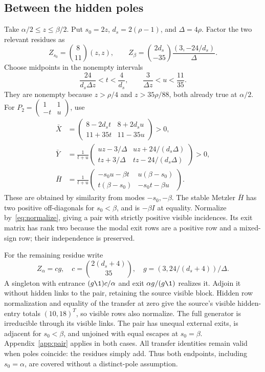 \subsection{Between the hidden poles}
Take $\alpha/2\le z\le\beta/2$. Put $s_0=2z$, $d_s=2(\rho-1)$, and $\Delta=4\rho$. Factor the two relevant residues as
\begin{equation}
 Z_{s_0}=\binom8{11}(z,z),\qquad
 Z_\beta=\binom{2d_s}{-35}\frac{(3,-24/d_s)}{\Delta}.
\end{equation}
Choose midpoints in the nonempty intervals
\begin{equation}
 \frac{24}{d_s\Delta z}<t<\frac4{d_s},\qquad
 \frac3{\Delta z}<u<\frac{11}{35}.\label{eq:twomodeintervals}
\end{equation}
They are nonempty because $z>\rho/4$ and $z>35\rho/88$, both already true at $\alpha/2$. For $P_2=\left(\begin{smallmatrix}1&1\\-t&u\end{smallmatrix}\right)$, use
\begin{align}
 \bar X&=\begin{pmatrix}8-2d_st&8+2d_su\\11+35t&11-35u\end{pmatrix}>0,\\
 \bar Y&=\frac1{t+u}\begin{pmatrix}uz-3/\Delta&uz+24/(d_s\Delta)\\tz+3/\Delta&tz-24/(d_s\Delta)\end{pmatrix}>0,\\
 \bar H&=\frac1{t+u}\begin{pmatrix}-s_0u-\beta t&u(\beta-s_0)\\t(\beta-s_0)&-s_0t-\beta u\end{pmatrix}.
\end{align}
These are obtained by similarity from modes $-s_0,-\beta$. The stable Metzler $\bar H$ has two positive off-diagonals for $s_0<\beta$, and is $-\beta I$ at equality. Normalize by~\eqref{eq:normalize}, giving a pair with strictly positive visible incidences. Its exit matrix has rank two because the modal exit rows are a positive row and a mixed-sign row; their independence is preserved.

For the remaining residue write
\begin{equation}
 Z_\alpha=cg,\quad c=\binom{2(d_s+4)}{35},\quad
 g=(3,24/(d_s+4))/\Delta.
\end{equation}
A singleton with entrance $(g\1)c/\alpha$ and exit $\alpha g/(g\1)$ realizes it. Adjoin it without hidden links to the pair, retaining the source visible block. Hidden row normalization and equality of the transfer at zero give the source's visible hidden-entry totals $(10,18)^T$, so visible rows also normalize. The full generator is irreducible through its visible links. The pair has unequal external exits, is adjacent for $s_0<\beta$, and unjoined with equal escapes at $s_0=\beta$. Appendix~\ref{app:pair} applies in both cases. All transfer identities remain valid when poles coincide: the residues simply add. Thus both endpoints, including $s_0=\alpha$, are covered without a distinct-pole assumption.

